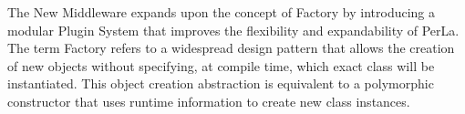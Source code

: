 The New Middleware expands upon the concept of Factory by introducing a modular
Plugin System that improves the flexibility and expandability of PerLa. The
term Factory refers to a widespread design pattern that allows the creation of
new objects without specifying, at compile time, which exact class will be
instantiated. This object creation abstraction is equivalent to a polymorphic
constructor that uses runtime information to create new class instances.
